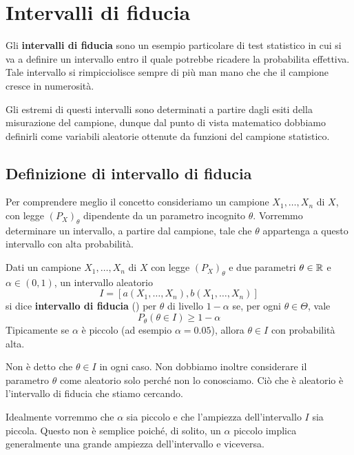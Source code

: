 \chapter{Intervalli di fiducia}
Gli \textbf{intervalli di fiducia} sono un esempio particolare di test statistico in cui si va a
definire un intervallo entro il quale potrebbe ricadere la probabilita effettiva. Tale intervallo
si rimpicciolisce sempre di più man mano che che il campione cresce in numerosità.

Gli estremi di questi intervalli sono determinati a partire dagli esiti della misurazione del
campione, dunque dal punto di vista matematico dobbiamo definirli come variabili aleatorie
ottenute da funzioni del campione statistico.

\section{Definizione di intervallo di fiducia}
Per comprendere meglio il concetto consideriamo un campione \iid $X_1, \dots, X_n$ di $X$, con
legge $(P_X)_\theta$ dipendente da un parametro incognito $\theta$. Vorremmo determinare un
intervallo, a partire dal campione, tale che $\theta$ appartenga a questo intervallo con alta
probabilità.

\begin{definition}
	Dati un campione $X_1, \dots, X_n$ \iid di $X$ con legge $(P_X)_\theta$ e due parametri
	$\theta \in \mathbb{R}$ e $\alpha \in (0,1)$, un intervallo aleatorio
	\[ I = [a(X_1, \dots, X_n), b(X_1, \dots, X_n)] \]
	si dice \textbf{intervallo di fiducia} (\IF) per $\theta$ di livello $1-\alpha$ se, per ogni
	$\theta \in \Theta$, vale
	\[ P_\theta (\theta \in I) \geq 1 - \alpha \]
	Tipicamente se $\alpha$ è piccolo (ad esempio $\alpha = 0.05$), allora $\theta \in I$ con
	probabilità alta.
\end{definition}

\begin{observation}
	Non è detto che $\theta \in I$ in ogni caso. Non dobbiamo inoltre considerare il parametro
	$\theta$ come aleatorio solo perché non lo conosciamo. Ciò che è aleatorio è l'intervallo di
	fiducia che stiamo cercando.
\end{observation}

Idealmente vorremmo che $\alpha$ sia piccolo e che l'ampiezza dell'intervallo $I$ sia piccola.
Questo non è semplice poiché, di solito, un $\alpha$ piccolo implica generalmente una grande
ampiezza dell'intervallo e viceversa.